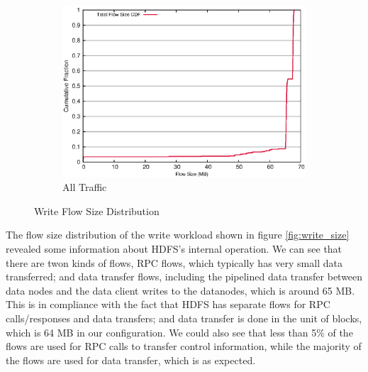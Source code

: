 \begin{figure}[!ht]
\begin{subfigure}[b]{.75\linewidth}
	\includegraphics[width=.99\textwidth]{figures/6writes/flow_size.eps}
	\caption{All Traffic}\label{fig:write_size:all}
   \end{subfigure}%
\caption{Write Flow Size Distribution}
\end{figure}


The flow size distribution of the write workload shown in figure \ref{fig:write_size} revealed some information about HDFS's internal operation. We can see that there are twon kinds of flows, RPC flows, which typically has very small data transferred; and data transfer flows, including the pipelined data transfer between data nodes and the data client writes to the datanodes, which is around 65 MB. This is in compliance with the fact that HDFS has separate flows for RPC calls/responses and data transfers; and data transfer is done in the unit of blocks, which is 64 MB in our configuration. We could also see that less than 5\% of the flows are used for RPC calls to transfer control information, while the majority of the flows are used for data transfer, which is as expected. 

